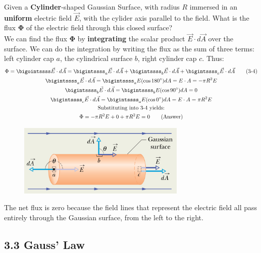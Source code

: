 \documentclass[12pt, a4paper]{article}
\begin{document}
		Given a \textbf{Cylinder}-shaped Gaussian Surface, with radius $R$ immersed in an \textbf{uniform} electric field $\vec{E}$, with the cylider axis parallel to the field. What is the flux $\mathbf{\Phi}$ of the electric field through this closed surface? \\
		We can find the flux $\mathbf{\Phi}$ by \textbf{integrating} the scalar product $\vec{E} \cdot d\vec{A}$ over the surface.
		We can do the integration by writing the flux as the sum of three terms: left cylinder cap $a$, the cylindrical surface $b$, right cylinder cap $c$. Thus:
		\begin{gather*}	%
			\Phi = \bigointssss \vec{E} \cdot d\vec{A} 
			= \bigintssss_{a} \vec{E} \cdot d\vec{A}
			+ \bigintssss_{b} \vec{E} \cdot d\vec{A}
			+ \bigintssss_{c} \vec{E} \cdot d\vec{A} 	\tag{3-4} \\
				\bigintssss_{a} \vec{E} \cdot d\vec{A} 
					= \bigintssss_{a} E(\cos180^\circ) dA = E \cdot A = -\pi R^2 E	\\
				\bigintssss_{b} \vec{E} \cdot d\vec{A}  
					= \bigintssss_{b} E(\cos90^\circ) dA = 0	\\
				\bigintssss_{c} \vec{E} \cdot d\vec{A} 
					= \bigintssss_{a} E(\cos0^\circ) dA = E \cdot A = \pi R^2 E	\\
			\text	{Substituting into 3-4 yields:}  \\
			\Phi = -\pi R^2 E + 0 + \pi R^2 E = 0 \tag{Answer}
		\end{gather*}
		
		\begin{figure}[!htb]  %
			\centering
			\includegraphics[width=8cm]{Physics2_PNGs/closed-cylinder.png}
			\caption*{}
			\label{fig:closed-cylinder}
		\end{figure}
		The net flux is zero because the field lines that represent the electric field all pass entirely through the Gaussian surface, from the left to the right.
		
		
		\subsection*{3.3 Gauss' Law}
		
\end{document}
